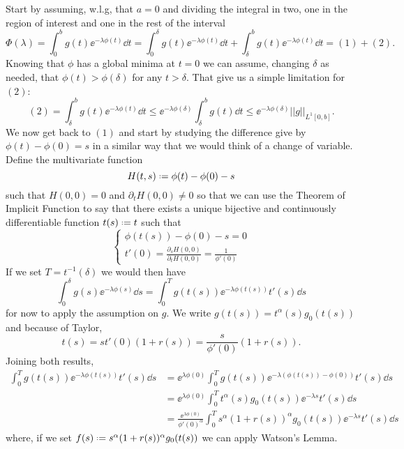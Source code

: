 \begin{Mproof}
	Start by assuming, w.l.g, that $a=0$ and dividing the integral in two, one in the region of interest and one in the rest of the interval
	$$\Phi(\lambda) = \int_{0}^{b} g(t) \ee^{-\lambda \phi(t)} \dd t = \int_{0}^{\delta} g(t) \ee^{-\lambda \phi(t)} \dd t + \int_{\delta}^{b} g(t) \ee^{-\lambda \phi(t)} \dd t = (1) + (2).$$
	Knowing that $\phi$ has a global minima at $t = 0$ we can assume, changing $\delta$ as needed, that $\phi(t) > \phi(\delta)$ for any $t > \delta$. That give us a simple limitation for $(2)$:
	$$(2) = \int_{\delta}^{b} g(t) \ee^{-\lambda \phi(t)} \dd t \leq \ee^{-\lambda \phi(\delta)} \int_{\delta}^{b} g(t) \dd t \leq \ee^{-\lambda \phi(\delta)} ||g||_{L^1[0,b]}.$$
	We now get back to $(1)$ and start by studying the difference give by $\phi(t) - \phi(0) = s$ in a similar way that we would think of a change of variable. Define the multivariate function 
	$$H(t,s) \deff \phi(t) - \phi(0) - s$$
	such that $H(0,0) = 0$ and $\partial_t H(0,0) \neq 0$ so that we can use the Theorem of Implicit Function to say that there exists a unique bijective and continuously differentiable function $t(s) \deff t$ such that 
	\begin{equation*}
		\begin{cases}
			\phi(t(s)) - \phi(0) - s = 0	\\
			t'(0) = \frac{\partial_s H(0,0)}{\partial_t H(0,0)} = \frac{1}{\phi'(0)} 
		\end{cases}
	\end{equation*}
	If we set $T = t^{-1}(\delta)$ we would then have
	$$\int_{0}^{\delta} g(s) \ee^{-\lambda \phi(s)} \dd s = \int_{0}^{T} g(t(s)) \ee^{-\lambda \phi(t(s))} t'(s) \dd s$$
	for now to apply the assumption on $g$. We write $g(t(s)) = t^\alpha(s) g_0(t(s))$ and because of Taylor,
	$$t(s) = s t'(0) (1+r(s)) = \frac{s}{\phi'(0)}(1+r(s)).$$
	Joining both results,
	\begin{equation}
		\begin{split}
			\int_{0}^{T} g(t(s)) \ee^{-\lambda \phi(t(s))} t'(s) \dd s & = \ee^{\lambda \phi(0)} \int_{0}^{T} g(t(s)) \ee^{-\lambda (\phi(t(s)) - \phi(0))} t'(s) \dd s \\
			& = \ee^{\lambda \phi(0)} \int_{0}^{T} t^\alpha(s) g_0(t(s)) \ee^{-\lambda s} t'(s) \dd s \\
			& = \frac{\ee^{\lambda \phi(0)}}{\phi'(0)^\alpha} \int_{0}^{T} s^\alpha (1+r(s))^\alpha g_0(t(s)) \ee^{-\lambda s} t'(s) \dd s			
		\end{split}
	\end{equation}
	where, if we set $f(s) \deff s^\alpha (1+r(s))^\alpha g_0(t(s))$ we can apply Watson's Lemma.
\end{Mproof}

